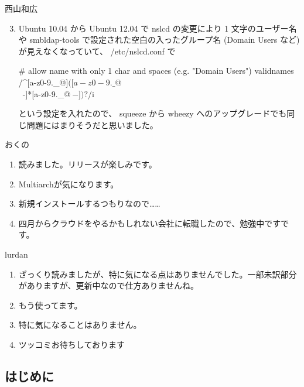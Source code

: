 \documentclass[mingoth,a4paper]{jsarticle}
\begin{document}
\begin{prework}{ 西山和広 }
\begin{enumerate}
    \setcounter{enumi}{2}
  \item %
    Ubuntu 10.04 から Ubuntu 12.04 で nslcd の変更により 1 文字のユーザー名や smbldap-tools で設定された空白の入ったグループ名 (Domain Users など) が見えなくなっていて、 /etc/nslcd.conf で
    \begin{commandline}
# allow name with only 1 char and spaces (e.g. "Domain Users")
validnames /^[a-z0-9.\_{}@$]([ a-z0-9.\_{}@$\\~-]*[a-z0-9.\_{}@$~-])?$/i
    \end{commandline}
    \noindent
    という設定を入れたので、 squeeze から wheezy へのアップグレードでも同じ問題にはまりそうだと思いました。
  \end{enumerate}
\end{prework}

\begin{prework}{ おくの }
  \begin{enumerate}
  \item %
    読みました。リリースが楽しみです。
  \item %
    Multiarchが気になります。
  \item %
    新規インストールするつもりなので……
  \item %
    四月からクラウドをやるかもしれない会社に転職したので、勉強中ですです。
  \end{enumerate}
\end{prework}

\clearpage

\begin{prework}{ lurdan }
  \begin{enumerate}
  \item %
   ざっくり読みましたが、特に気になる点はありませんでした。一部未訳部分がありますが、更新中なので仕方ありませんね。
 \item %
   もう使ってます。
 \item %
   特に気になることはありません。
 \item %
   ツッコミお待ちしております
 \end{enumerate}
\end{prework}

\clearpage
{}

\subsection{はじめに}
\end{document}
